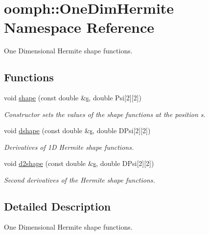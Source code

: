 \hypertarget{namespaceoomph_1_1OneDimHermite}{}\section{oomph\+:\+:One\+Dim\+Hermite Namespace Reference}
\label{namespaceoomph_1_1OneDimHermite}


One Dimensional Hermite shape functions.  


\subsection*{Functions}
\begin{DoxyCompactItemize}
\item 
void \hyperlink{namespaceoomph_1_1OneDimHermite_aebab8114996e792678738c0b203ee6dc}{shape} (const double \&\hyperlink{cfortran_8h_ab7123126e4885ef647dd9c6e3807a21c}{s}, double Psi\mbox{[}2\mbox{]}\mbox{[}2\mbox{]})
\begin{DoxyCompactList}\small\item\em Constructor sets the values of the shape functions at the position s. \end{DoxyCompactList}\item 
void \hyperlink{namespaceoomph_1_1OneDimHermite_a813edd3bba87119e400fbcf996e48b2d}{dshape} (const double \&\hyperlink{cfortran_8h_ab7123126e4885ef647dd9c6e3807a21c}{s}, double D\+Psi\mbox{[}2\mbox{]}\mbox{[}2\mbox{]})
\begin{DoxyCompactList}\small\item\em Derivatives of 1D Hermite shape functions. \end{DoxyCompactList}\item 
void \hyperlink{namespaceoomph_1_1OneDimHermite_a84928411c3c92bf563b9f04005436fd1}{d2shape} (const double \&\hyperlink{cfortran_8h_ab7123126e4885ef647dd9c6e3807a21c}{s}, double D\+Psi\mbox{[}2\mbox{]}\mbox{[}2\mbox{]})
\begin{DoxyCompactList}\small\item\em Second derivatives of the Hermite shape functions. \end{DoxyCompactList}\end{DoxyCompactItemize}


\subsection{Detailed Description}
One Dimensional Hermite shape functions. 

